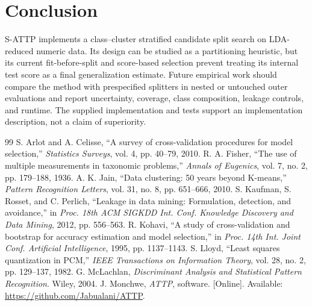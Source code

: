 \documentclass[conference]{IEEEtran}
\begin{document}
\section{Conclusion}
S-ATTP implements a class--cluster stratified candidate split search on LDA-reduced numeric data. Its design can be studied as a partitioning heuristic, but its current fit-before-split and score-based selection prevent treating its internal test score as a final generalization estimate. Future empirical work should compare the method with prespecified splitters in nested or untouched outer evaluations and report uncertainty, coverage, class composition, leakage controls, and runtime. The supplied implementation and tests support an implementation description, not a claim of superiority.

\begin{thebibliography}{99}
 S. Arlot and A. Celisse, ``A survey of cross-validation procedures for model selection,'' \emph{Statistics Surveys}, vol. 4, pp. 40--79, 2010.
 R. A. Fisher, ``The use of multiple measurements in taxonomic problems,'' \emph{Annals of Eugenics}, vol. 7, no. 2, pp. 179--188, 1936.
 A. K. Jain, ``Data clustering: 50 years beyond K-means,'' \emph{Pattern Recognition Letters}, vol. 31, no. 8, pp. 651--666, 2010.
 S. Kaufman, S. Rosset, and C. Perlich, ``Leakage in data mining: Formulation, detection, and avoidance,'' in \emph{Proc. 18th ACM SIGKDD Int. Conf. Knowledge Discovery and Data Mining}, 2012, pp. 556--563.
 R. Kohavi, ``A study of cross-validation and bootstrap for accuracy estimation and model selection,'' in \emph{Proc. 14th Int. Joint Conf. Artificial Intelligence}, 1995, pp. 1137--1143.
 S. Lloyd, ``Least squares quantization in PCM,'' \emph{IEEE Transactions on Information Theory}, vol. 28, no. 2, pp. 129--137, 1982.
 G. McLachlan, \emph{Discriminant Analysis and Statistical Pattern Recognition}. Wiley, 2004.
 J. Monchwe, \emph{ATTP}, software. [Online]. Available: \url{https://github.com/Jabualani/ATTP}.
\end{thebibliography}
\end{document}
